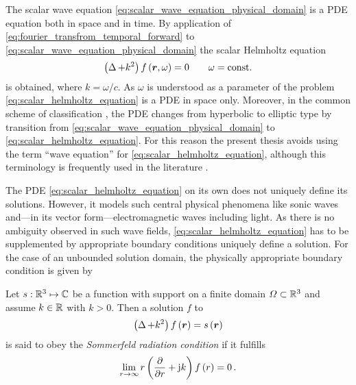 The scalar wave equation \eqref{eq:scalar_wave_equation_physical_domain}
is a \ac{PDE} equation both in space and in time.
By application of \eqref{eq:fourier_transfrom_temporal_forward} to
\eqref{eq:scalar_wave_equation_physical_domain} the scalar Helmholtz equation
\begin{equation}\label{eq:scalar_helmholtz_equation}
	\left( \laplace + k^2 \right) f \left( \robs, \omega \right) = 0
	\qquad \omega = \mathrm{const.}
\end{equation}
is obtained, where $k = \omega / c$.
As $\omega$ is understood as a parameter of the problem
\eqref{eq:scalar_helmholtz_equation} is a \ac{PDE} in space only.
Moreover, in the common scheme of classification \cite[38]{Sommerfeld1964},
the \ac{PDE} changes from hyperbolic to elliptic type by transition from
\eqref{eq:scalar_wave_equation_physical_domain} to
\eqref{eq:scalar_helmholtz_equation}. For this reason the present
thesis avoids using the term \enquote{wave equation} for
\eqref{eq:scalar_helmholtz_equation}, although this terminology is frequently
used in the literature \cite[238]{Sommerfeld1964}\cite{Coifman1993}.

The \ac{PDE} \eqref{eq:scalar_helmholtz_equation} on its own does not uniquely
define its solutions.
However, it models such central physical phenomena like sonic waves
and---in its vector form---electromagnetic waves including light.
As there is no ambiguity observed in such wave fields,
\eqref{eq:scalar_helmholtz_equation} has to be supplemented by appropriate
boundary conditions uniquely define a solution.
For the case of an unbounded solution domain, the physically appropriate
boundary condition is given by
\begin{definition}
	\label{def:sommerfeld_radiation_condition}
	Let $s: \mathbb{R}^3 \mapsto \mathbb{C}$ be a function with support on a finite domain
	$\Omega \subset \mathbb{R}^3$ and assume $k \in \mathbb{R}$ with $k > 0$.
	Then a solution $f$ to
	\begin{equation}\label{eq:scalar_helmholtz_equation_inhomogeneous}
		\left( \laplace + k^2 \right) f \left( \robs \right) =
		s \left( \robs \right)
	\end{equation}
	is said to obey the \emph{Sommerfeld radiation condition} if it fulfills
	\cite{Sommerfeld1912}\cite[189]{Sommerfeld1964}\cite{schot1992}
	\begin{equation}\label{eq:sommerfeld_radiation_condition}
		\lim_{r \to \infty}
		r \left( \frac{\partial}{\partial r} + \mathrm{j} k \right)
		f \left( r \right) = 0
		\, .
	\end{equation}
\end{definition}


